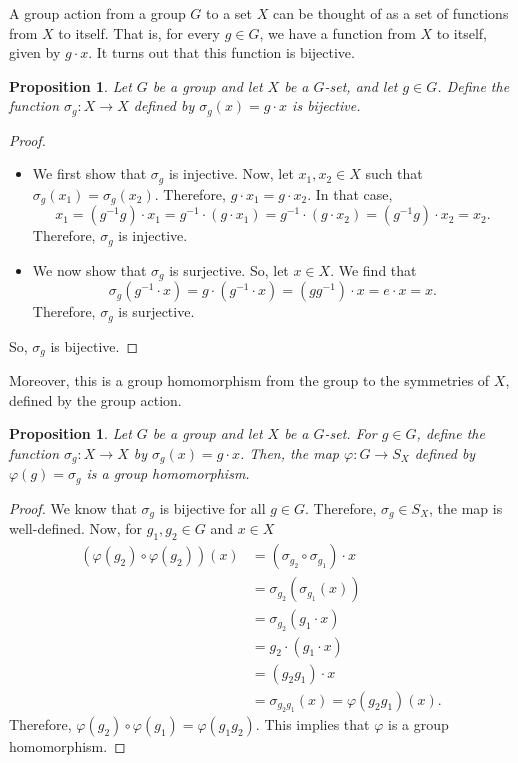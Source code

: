 \documentclass[a4paper, openany]{memoir}
\theoremstyle{definition}
\theoremstyle{plain}
\newtheorem{proposition}[definition]{Proposition}
\begin{document}
A group action from a group $G$ to a set $X$ can be thought of as a set of functions from $X$ to itself. That is, for every $g \in G$, we have a function from $X$ to itself, given by $g \cdot x$. It turns out that this function is bijective.
\begin{proposition}
Let $G$ be a group and let $X$ be a $G$-set, and let $g \in G$. Define the function $\sigma_g: X \to X$ defined by $\sigma_g(x) = g \cdot x$ is bijective.
\end{proposition}
\begin{proof}
\hspace*{0pt}
\begin{itemize}
    \item We first show that $\sigma_g$ is injective. Now, let $x_1, x_2 \in X$ such that $\sigma_g(x_1) = \sigma_g(x_2)$. Therefore, $g \cdot x_1 = g \cdot x_2$. In that case,
    \[x_1 = (g^{-1}g) \cdot x_1 = g^{-1} \cdot (g \cdot x_1) = g^{-1} \cdot (g \cdot x_2) = (g^{-1}g) \cdot x_2 = x_2.\]
    Therefore, $\sigma_g$ is injective.
    \item We now show that $\sigma_g$ is surjective. So, let $x \in X$. We find that
    \[\sigma_g(g^{-1} \cdot x) = g \cdot (g^{-1} \cdot x) = (gg^{-1}) \cdot x = e \cdot x = x.\]
    Therefore, $\sigma_g$ is surjective.
\end{itemize}
So, $\sigma_g$ is bijective.
\end{proof}
\noindent Moreover, this is a group homomorphism from the group to the symmetries of $X$, defined by the group action.
\begin{proposition}
Let $G$ be a group and let $X$ be a $G$-set. For $g \in G$, define the function $\sigma_g: X \to X$ by $\sigma_g(x) = g \cdot x$. Then, the map $\varphi: G \to S_X$ defined by $\varphi(g) = \sigma_g$ is a group homomorphism.
\end{proposition}
\begin{proof}
We know that $\sigma_g$ is bijective for all $g \in G$. Therefore, $\sigma_g \in S_X$, the map is well-defined. Now, for $g_1, g_2 \in G$ and $x \in X$
\begin{align*}
    (\varphi(g_2) \circ \varphi(g_2))(x) &= (\sigma_{g_2} \circ \sigma_{g_1}) \cdot x \\
    &= \sigma_{g_2}(\sigma_{g_1}(x)) \\
    &= \sigma_{g_2} (g_1 \cdot x) \\
    &= g_2 \cdot (g_1 \cdot x) \\
    &= (g_2g_1) \cdot x \\
    &= \sigma_{g_2g_1}(x) = \varphi(g_2g_1)(x).
\end{align*}
Therefore, $\varphi(g_2) \circ \varphi(g_1) = \varphi(g_1 g_2)$. This implies that $\varphi$ is a group homomorphism.
\end{proof}
\end{document}
